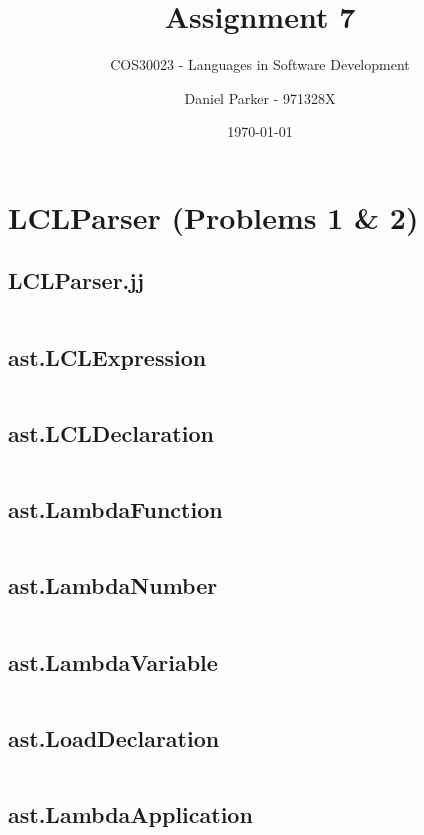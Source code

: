 \documentclass[11pt, numbers=endperiod, parskip=half]{scrartcl}
\title{Assignment 7}
\subtitle{COS30023 - Languages in Software Development}
\author{Daniel Parker - 971328X}
\date{\today}
\begin{document}

\maketitle
\section{LCLParser (Problems 1 \& 2)}
\subsection{LCLParser.jj}
\inputminted[tabsize=2]{java}{LCLParser/src/LCLParser.jj}

\subsection{ast.LCLExpression}
\inputminted[tabsize=2]{java}{LCLParser/src/ast/LCLExpression.java}

\subsection{ast.LCLDeclaration}
\inputminted[tabsize=2]{java}{LCLParser/src/ast/LCLDeclaration.java}

\subsection{ast.LambdaFunction}
\inputminted[tabsize=2]{java}{LCLParser/src/ast/LambdaFunction.java}

\subsection{ast.LambdaNumber}
\inputminted[tabsize=2]{java}{LCLParser/src/ast/LambdaNumber.java}

\subsection{ast.LambdaVariable}
\inputminted[tabsize=2]{java}{LCLParser/src/ast/LambdaVariable.java}

\subsection{ast.LoadDeclaration}
\inputminted[tabsize=2]{java}{LCLParser/src/ast/LoadDeclaration.java}

\subsection{ast.LambdaApplication}
\inputminted[tabsize=2]{java}{LCLParser/src/ast/LambdaNumber.java}
\end{document}
